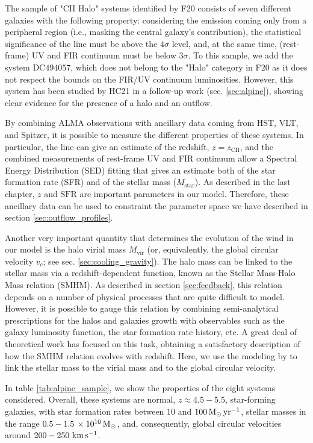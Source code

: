 The sample of "CII Halo" systems identified by F20 consists of seven different galaxies with the following property: considering the emission coming only from a peripheral region (i.e., masking the central galaxy's contribution), the statistical significance of the \CII line must be above the $4\sigma$ level, and, at the same time, (rest-frame) UV and FIR continuum must be below $3\sigma$. To this sample, we add the system DC$494057$, which does not belong to the "\CII Halo" category in F20 as it does not respect the bounds on the FIR/UV continuum luminosities. However, this system has been studied by HC21 \citep{herrera2021kiloparsec} in a follow-up work (sec. \ref{sec:alpine}), showing clear evidence for the presence of a \CII halo and an outflow. 

By combining ALMA observations with ancillary data coming from HST, VLT, and Spitzer, it is possible to measure the different properties of these systems. In particular, the \CII line can give an estimate of the redshift, $z = z_\mathrm{CII}$, and the combined measurements of rest-frame UV and FIR continuum allow a Spectral Energy Distribution (SED) fitting that gives an estimate both of the star formation rate (SFR) and of the stellar mass ($M_\mathrm{star}$). As described in the last chapter, $z$ and $\mathrm{SFR}$ are important parameters in our model. Therefore, these ancillary data can be used to constraint the parameter space we have described in section \ref{sec:outflow_profiles}. 

Another very important quantity that determines the evolution of the wind in our model is the halo virial mass $M_\mathrm{vir}$ (or, equivalently, the global circular velocity $v_c$; see sec. \ref{sec:cooling_gravity}). The halo mass can be linked to the stellar mass via a redshift-dependent function, known as the Stellar Mass-Halo Mass relation (SMHM).
%
As described in section \ref{sec:feedback}, this relation depends on a number of physical processes that are quite difficult to model. However, it is possible to gauge this relation by combining semi-analytical prescriptions for the halos and galaxies growth with observables such as the galaxy luminosity function, the star formation rate history, etc.
%
A great deal of theoretical work has focused on this task, obtaining a satisfactory description of how the SMHM relation evolves with redshift. Here, we use the modeling by \citet{behroozi2013average} to link the stellar mass to the virial mass and to the global circular velocity.

In table \ref{tab:alpine_sample}, we show the properties of the eight systems considered. Overall, these systems are normal, $z \approx 4.5-5.5$, star-forming galaxies, with star formation rates between $10$ and $100\,{\rm M}_{\odot}\,\mathrm{yr}^{-1}$, stellar masses in the range $0.5-1.5 \,\times10^{10}\,{\rm M}_{\odot}$, and, consequently, global circular velocities around $200-250\,\,\rm km\,s^{-1}$.

